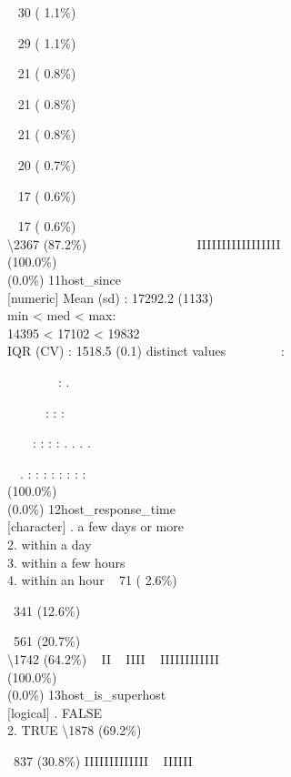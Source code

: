 \documentclass[
  journal,
]{IEEEtran}%
\begin{document}
\strut ~ 30 ( 1.1\%)\\
\strut ~ 29 ( 1.1\%)\\
\strut ~ 21 ( 0.8\%)\\
\strut ~ 21 ( 0.8\%)\\
\strut ~ 21 ( 0.8\%)\\
\strut ~ 20 ( 0.7\%)\\
\strut ~ 17 ( 0.6\%)\\
\strut ~ 17 ( 0.6\%)\\
\textbackslash2367 (87.2\%) \textbar{} \textbar~ ~ ~ ~ ~ ~ ~ ~ ~ ~
IIIIIIIIIIIIIIIII \\
(100.0\%) \\
(0.0\%) \textbar{} \textbar{} 11\textbar host\_since\\
{[}numeric{]} \textbar Mean (sd) : 17292.2 (1133)\\
min \textless{} med \textless{} max:\\
14395 \textless{} 17102 \textless{} 19832\\
IQR (CV) : 1518.5 (0.1)  distinct values \textbar{}
\textbar~~~~~~~~:\\
\strut ~~~~~~~~: .\\
\strut ~~~~~~: : :\\
\strut ~~~~: : : : . . . .\\
\strut ~~. : : : : : : : : \\
(100.0\%) \\
(0.0\%) \textbar{} \textbar{} 12\textbar host\_response\_time\\
{[}character{]} . a few days or more\\
2. within a day\\
3. within a few hours\\
4. within an hour \textbar~ 71 ( 2.6\%)\\
\strut ~341 (12.6\%)\\
\strut ~561 (20.7\%)\\
\textbackslash1742 (64.2\%) \textbar{} \textbar~ II ~ IIII ~
IIIIIIIIIIII \\
(100.0\%) \\
(0.0\%) \textbar{} \textbar{} 13\textbar host\_is\_superhost\\
{[}logical{]} . FALSE\\
2. TRUE \textbar\textbackslash1878 (69.2\%)\\
\strut ~837 (30.8\%) \textbar{} \textbar IIIIIIIIIIIII ~ IIIIII
\\
\end{document}
